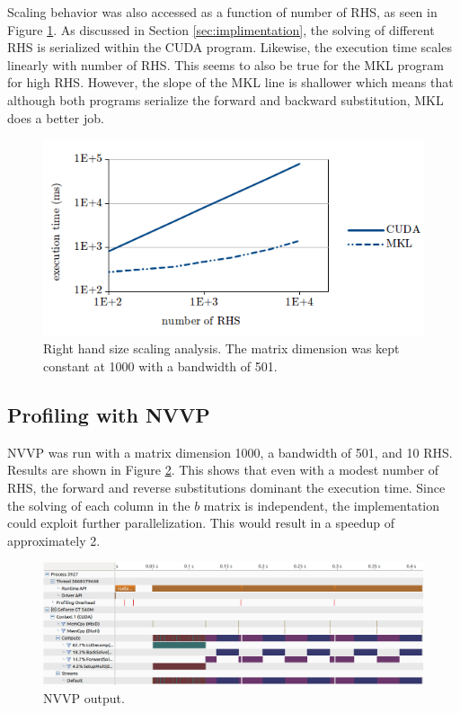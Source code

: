 \documentclass[12pt]{article}
\begin{document}
Scaling behavior was also accessed as a function of number of RHS, as seen in
Figure \ref{rhs}. As discussed in Section \ref{sec:implimentation}, the
solving of different RHS is serialized within the CUDA program.
Likewise, the execution time scales linearly with number of RHS. This seems to
also be true for the MKL program for high RHS. However, the slope of the MKL
line is shallower which means that although both programs serialize the forward
and backward substitution, MKL does a better job.

\begin{figure}[H]
\caption{Right hand size scaling analysis. The matrix dimension was kept constant at 1000 with a bandwidth of 501.}
\label{rhs}
\centerline{\includegraphics[width=12cm]{rhs.png}}
\end{figure}


\subsection{Profiling with NVVP}

NVVP was run with a matrix dimension 1000, a bandwidth of 501, and 10 RHS.
 Results are shown in Figure \ref{nvvp}. This shows that even with a
modest number of RHS, the forward and reverse substitutions
dominant the execution time. Since the solving of each column in the $b$ matrix is
independent, the implementation could exploit further
parallelization. This would result in a speedup of approximately 2.

\begin{figure}[H]
\caption{NVVP output.}
\label{nvvp}
\centerline{\includegraphics[width=12cm]{nvvp.png}}
\end{figure}
\end{document}
